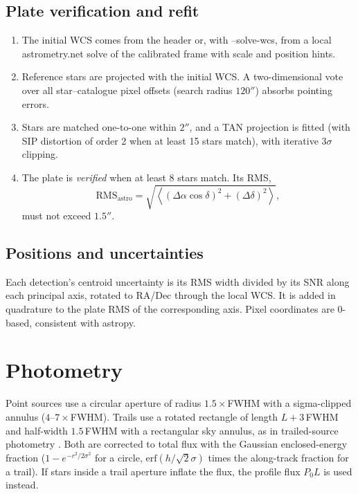 \documentclass[11pt,a4paper]{article}
\newcommand{\brkus}{\textunderscore\allowbreak}
\newcommand{\code}[1]{{\ttfamily\let\_\brkus #1}}
\begin{document}
\subsection{Plate verification and refit}
\begin{enumerate}
\item The initial WCS comes from the header or, with \code{--solve-wcs}, from a local
      astrometry.net \cite{lang2010} solve of the calibrated frame with scale and position hints.
\item Reference stars are projected with the initial WCS. A two-dimensional vote over all
      star--catalogue pixel offsets (search radius $120''$) absorbs pointing errors.
\item Stars are matched one-to-one within $2''$, and a TAN projection is fitted
      (with SIP distortion of order 2 when at least 15 stars match), with iterative
      $3\sigma$ clipping.
\item The plate is \emph{verified} when at least 8 stars match. Its RMS,
\begin{equation}
\mathrm{RMS}_\mathrm{astro} = \sqrt{\left\langle (\Delta\alpha\cos\delta)^2 + (\Delta\delta)^2\right\rangle},
\end{equation}
      must not exceed $1.5''$.
\end{enumerate}

\subsection{Positions and uncertainties}
Each detection's centroid uncertainty is its RMS width divided by its SNR along each
principal axis, rotated to RA/Dec through the local WCS. It is added in quadrature to the
plate RMS of the corresponding axis. Pixel coordinates are 0-based, consistent with astropy.

\section{Photometry}

Point sources use a circular aperture of radius $1.5\times$FWHM with a sigma-clipped
annulus ($4$--$7\times$FWHM). Trails use a rotated rectangle of length $L+3\,$FWHM and half-width
$1.5\,$FWHM with a rectangular sky annulus, as in trailed-source photometry \cite{veres2012}. Both are corrected to total flux with the Gaussian
enclosed-energy fraction ($1-e^{-r^2/2\sigma^2}$ for a circle, $\mathrm{erf}(h/\sqrt2\sigma)$ times
the along-track fraction for a trail). If stars inside a trail aperture inflate the flux, the
profile flux $P_0L$ is used instead.
\end{document}
